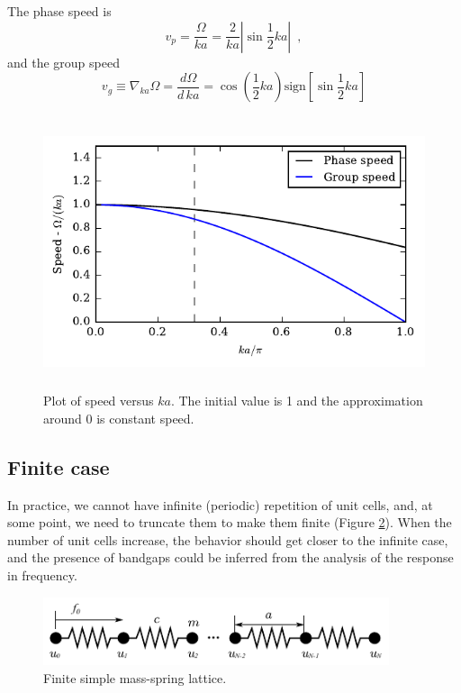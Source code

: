 \documentclass[11pt]{article}
\begin{document}
The phase speed is
\[v_p = \frac{\Omega}{ka} = \frac{2}{ka}\left\vert \sin \frac{1}{2} ka\right\vert \enspace ,\]
and the group speed
\[v_g \equiv \nabla_{ka}\Omega = \frac{d\Omega}{d\, ka} = \cos \left(\frac{1}{2} ka\right) \text{sign}\left[\sin \frac{1}{2} ka\right] \]

\begin{figure}[h]
\centering
\includegraphics[height=8cm]{img/spring-mass-speeds.pdf} 
\caption{Plot of speed versus $ka$. The initial value is 1 and the approximation around 0 is constant speed.}
\label{fig:spring-mass-speed}
\end{figure}



\subsection{Finite case}
In practice, we cannot have infinite (periodic) repetition of unit cells, and, at some point, we need to truncate them to make them finite (Figure \ref{fig:spring-mass-finite}). When the number of unit cells increase, the behavior should get closer to the infinite case, and the presence of bandgaps could be inferred from the analysis of the response in frequency.
\begin{figure}[H]
\centering
\includegraphics[width=4in]{img/spring-mass-finite.pdf} 
\caption{Finite simple mass-spring lattice.}\label{fig:spring-mass-finite}
\end{figure}
\end{document}
